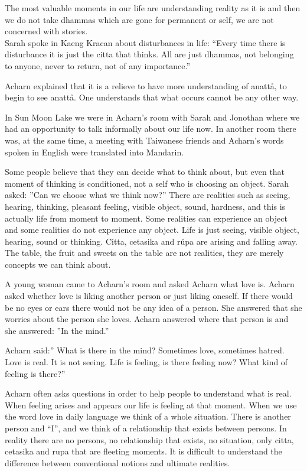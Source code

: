 \documentclass[10pt,a4paper,final]{article}
\begin{document}
The most valuable moments in our life are
understanding reality as it is and then we do not take dhammas which are
gone for permanent or self, we are not concerned with stories. \\
Sarah spoke in Kaeng Kracan about disturbances in life:
``Every time there is disturbance it is just the citta that thinks. All
are just dhammas, not belonging to anyone, never to return, not of any
importance.'' 

Acharn explained that it is a relieve to have more
understanding of anattå, to begin to see anattå. One understands that
what occurs cannot be any other way.

In Sun Moon Lake we were in Acharn's room with Sarah and
Jonothan where we had an opportunity to talk informally about our life
now. In another room there was, at the same time, a meeting with
Taiwanese friends and Acharn's words spoken in English were translated
into Mandarin. 

Some people believe that they can decide what to think about,
but even that moment of thinking is conditioned, not a self who is
choosing an object. Sarah asked: ''Can we choose what we think now?''
There are realities such as seeing, hearing, thinking, pleasant feeling,
visible object, sound, hardness, and this is actually life from moment
to moment. Some realities can experience an object and some realities do
not experience any object. Life is just seeing, visible object, hearing,
sound or thinking. Citta, cetasika and rúpa are arising and falling
away. The table, the fruit and sweets on the table are not realities,
they are merely concepts we can think about. 

A young woman came to Acharn's room and asked Acharn what
love is. Acharn asked whether love is liking another person or just
liking oneself. If there would be no eyes or ears there would not be any
idea of a person. She answered that she worries about the person she
loves. Acharn answered where that person is and she answered: ''In the
mind.'' 

Acharn said:'' What is there in the mind? Sometimes love,
sometimes hatred. Love is real. It is not seeing. Life is feeling, is
there feeling now? What kind of feeling is there?'' 

Acharn often asks questions in order to help people to
understand what is real. When feeling arises and appears our life is
feeling at that moment. When we use the word love in daily language we
think of a whole situation. There is another person and ``I'', and we
think of a relationship that exists between persons. In reality there
are no persons, no relationship that exists, no situation, only citta,
cetasika and rupa that are fleeting moments. It is difficult to
understand the difference between conventional notions and ultimate
realities.
\end{document}

